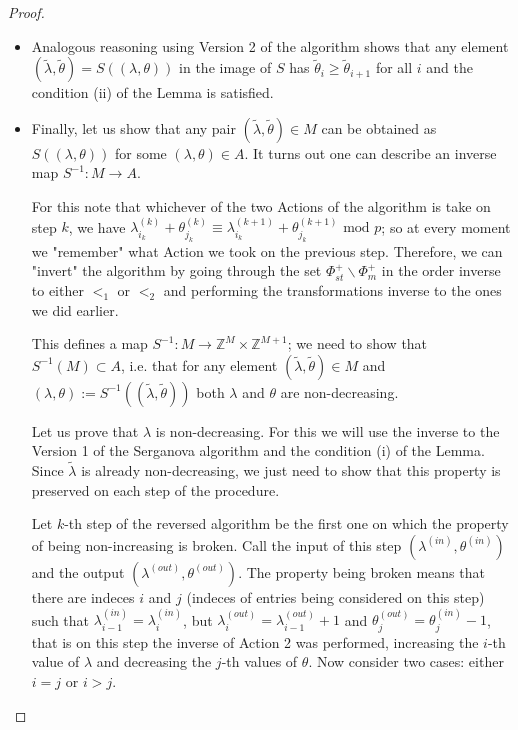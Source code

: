 \documentclass[12pt]{amsart}
\numberwithin{equation}{section}
\numberwithin{equation}{section}
\theoremstyle{definition}
\begin{document}
\begin{proof}
\begin{itemize}
        
        \item Analogous reasoning using Version 2 of the algorithm shows that any element $(\tilde\lambda,\tilde\theta)=S\left( (\lambda,\theta)\right)$ in the image of $S$ has $\tilde\theta_{i} \ge \tilde\theta_{i+1}$ for all $i$  and the condition (ii) of the Lemma is satisfied.

        \item Finally, let us show that any pair $(\tilde\lambda,\tilde\theta) \in M$ can be obtained as $S((\lambda,\theta))$ for some $(\lambda,\theta) \in A$. It turns out one can describe an inverse map $S^{-1}:M\to A$.

        For this note that whichever of the two Actions of the algorithm is take on step $k$, we have $\lambda^{(k)}_{i_k}+\theta^{(k)}_{j_k} \equiv \lambda^{(k+1)}_{i_k}+\theta^{(k+1)}_{j_k} \text{ mod }p$; so at every moment we "remember" what Action we took on the previous step. Therefore, we can "invert" the algorithm by going through the set $\Phi^+_{st}\backslash \Phi^+_m$ in the order inverse to either $<_1$ or $<_2$ and performing the transformations inverse to the ones we did earlier.

        This defines a map $S^{-1}:M \to \mathbb{Z}^M\times\mathbb{Z}^{M+1}$; we need to show that $S^{-1}(M)\subset A$, i.e. that for any element $(\tilde\lambda,\tilde\theta)\in M$ and $(\lambda,\theta):=S^{-1}((\tilde\lambda,\tilde\theta))$ both $\lambda$ and $\theta$ are non-decreasing.

        Let us prove that $\lambda$ is non-decreasing.  For this we will use the inverse to the Version 1 of the Serganova algorithm and the condition (i) of the Lemma. Since $\tilde\lambda$ is already non-decreasing, we just need to show that this property is preserved on each step of the procedure. 

        Let $k$-th step of the reversed algorithm be the first one on which the property of being non-increasing is broken. Call the input of this step $(\lambda^{(in)},\theta^{(in)})$ and the output $(\lambda^{(out)},\theta^{(out)})$. The property being broken means that there are indeces $i$ and $j$ (indeces of entries being considered on this step) such that  $\lambda^{(in)}_{i-1}=\lambda^{(in)}_{i}$, but $\lambda^{(out)}_i= \lambda^{(out)}_{i-1}+1$ and $\theta^{(out)}_j = \theta^{(in)}_j-1$, that is on this step the inverse of Action 2 was performed, increasing the $i$-th value of $\lambda$ and decreasing the $j$-th values of $\theta$. Now consider two cases: either $i=j$ or $i>j$. 


\end{itemize}
\end{proof}
\end{document}
